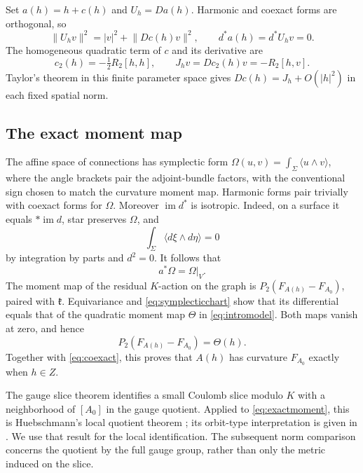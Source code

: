 \documentclass[11pt]{amsart}
\theoremstyle{definition}
\theoremstyle{remark}
\newcommand{\kk}{\mathfrak k}
\newcommand{\im}{\operatorname{im}}
\newcommand{\norm}[1]{\lVert #1\rVert}
\begin{document}
Set $a(h)=h+c(h)$ and $U_h=Da(h)$. Harmonic and coexact forms are
orthogonal, so
\begin{equation}\label{eq:graphmetric}
 \norm{U_hv}^2=|v|^2+\norm{Dc(h)v}^2,
 \qquad d^*a(h)=d^*U_hv=0.
\end{equation}
The homogeneous quadratic term of $c$ and its derivative are
\begin{equation}\label{eq:cquadratic}
 c_2(h)=-\tfrac12R_2[h,h],\qquad
 J_hv=Dc_2(h)v=-R_2[h,v].
\end{equation}
Taylor's theorem in this finite parameter space gives
$Dc(h)=J_h+O(|h|^2)$ in each fixed spatial norm.

\subsection{The exact moment map}
The affine space of connections has symplectic form
$\Omega(u,v)=\int_\Sigma\langle u\wedge v\rangle$, where the
angle brackets pair the adjoint-bundle factors, with the conventional
sign chosen to match the curvature moment map. Harmonic forms pair
trivially with coexact forms for $\Omega$. Moreover $\im d^*$ is
isotropic. Indeed, on a surface it equals $*\im d$, star preserves
$\Omega$, and
\[
 \int_\Sigma\langle d\xi\wedge d\eta\rangle=0
\]
by integration by parts and $d^2=0$. It follows that
\begin{equation}\label{eq:symplecticchart}
 a^*\Omega=\Omega|_V.
\end{equation}
The moment map of the residual $K$-action on the graph is
$P_2(F_{A(h)}-F_{A_0})$, paired with $\kk$. Equivariance and
\eqref{eq:symplecticchart} show that its differential equals that
of the quadratic moment map $\Theta$ in \eqref{eq:intromodel}.
Both maps vanish at zero, and hence
\begin{equation}\label{eq:exactmoment}
 P_2(F_{A(h)}-F_{A_0})=\Theta(h).
\end{equation}
Together with \eqref{eq:coexact}, this proves that $A(h)$ has
curvature $F_{A_0}$ exactly when $h\in Z$.

The gauge slice theorem identifies a small Coulomb slice modulo $K$
with a neighborhood of $[A_0]$ in the gauge quotient. Applied to
\eqref{eq:exactmoment}, this is Huebschmann's local quotient theorem
\cite[Theorem 2.32]{Hue95}; its orbit-type interpretation is given
in \cite{Hue96}. We use that result for the local identification.
The subsequent norm comparison concerns the quotient by the full
gauge group, rather than only the metric induced on the slice.
\end{document}
